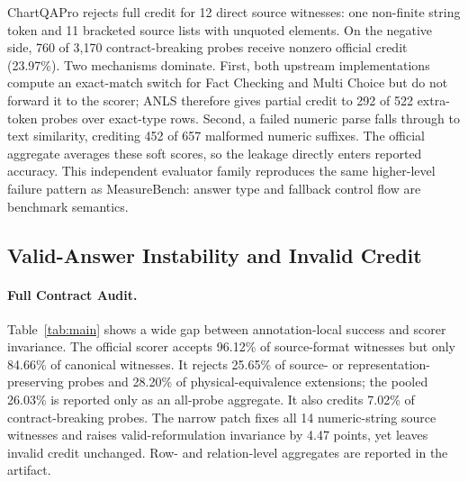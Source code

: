 \documentclass[a4paper]{llncs}
\begin{document}
ChartQAPro rejects full credit for 12 direct source witnesses: one non-finite string token and 11 bracketed source lists with unquoted elements. On the negative side, 760 of 3,170 contract-breaking probes receive nonzero official credit (23.97\%). Two mechanisms dominate. First, both upstream implementations compute an exact-match switch for Fact Checking and Multi Choice but do not forward it to the scorer; ANLS therefore gives partial credit to 292 of 522 extra-token probes over exact-type rows. Second, a failed numeric parse falls through to text similarity, crediting 452 of 657 malformed numeric suffixes. The official aggregate averages these soft scores, so the leakage directly enters reported accuracy. This independent evaluator family reproduces the same higher-level failure pattern as MeasureBench: answer type and fallback control flow are benchmark semantics.

\subsection{Valid-Answer Instability and Invalid Credit}
\paragraph{Full Contract Audit.}
Table~\ref{tab:main} shows a wide gap between annotation-local success and scorer invariance. The official scorer accepts 96.12\% of source-format witnesses but only 84.66\% of canonical witnesses. It rejects 25.65\% of source- or representation-preserving probes and 28.20\% of physical-equivalence extensions; the pooled 26.03\% is reported only as an all-probe aggregate. It also credits 7.02\% of contract-breaking probes. The narrow patch fixes all 14 numeric-string source witnesses and raises valid-reformulation invariance by 4.47 points, yet leaves invalid credit unchanged. Row- and relation-level aggregates are reported in the artifact.
\end{document}
